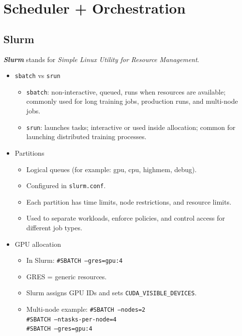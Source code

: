 \documentclass[12pt]{article}
\let\origtextbf\textbf
\renewcommand{\textbf}[1]{\origtextbf{\textit{#1}}}
\begin{document}
\vspace{2cm}

\section{Scheduler + Orchestration}

\subsection{Slurm}
\textbf{Slurm} stands for \textit{Simple Linux Utility for Resource Management}.

\begin{itemize}
\item \texttt{sbatch} vs \texttt{srun}
\begin{itemize}
\item \texttt{sbatch}: non-interactive, queued, runs when resources are available; commonly used for long training jobs, production runs, and multi-node jobs.
\item \texttt{srun}: launches tasks; interactive or used inside allocation; common for launching distributed training processes.
\end{itemize}

\item Partitions
\begin{itemize}
\item Logical queues (for example: gpu, cpu, highmem, debug).
\item Configured in \texttt{slurm.conf}.
\item Each partition has time limits, node restrictions, and resource limits.
\item Used to separate workloads, enforce policies, and control access for different job types.
\end{itemize}

\item GPU allocation
\begin{itemize}
\item In Slurm:
\texttt{\#SBATCH --gres=gpu:4}
\item GRES = generic resources.
\item Slurm assigns GPU IDs and sets \texttt{CUDA\_VISIBLE\_DEVICES}.
\item Multi-node example:
\texttt{\#SBATCH --nodes=2}\\
\texttt{\#SBATCH --ntasks-per-node=4}\\
\texttt{\#SBATCH --gres=gpu:4}
\end{itemize}


\end{itemize}
\end{document}
